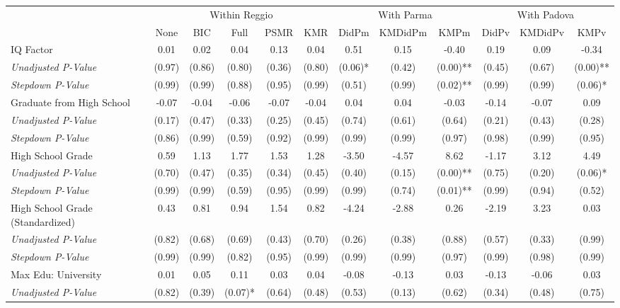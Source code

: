 \begin{tabular}{l c c c c c c c c c c c}
\toprule
& \multicolumn{5}{c}{Within Reggio} & \multicolumn{3}{c}{With Parma} & \multicolumn{3}{c}{With Padova} \\\cmidrule(lr){2-6} \cmidrule(lr){7-9} \cmidrule(lr){10-12}
 & None & BIC & Full & PSMR & KMR & DidPm & KMDidPm & KMPm & DidPv & KMDidPv & KMPv \\
\midrule
IQ Factor & 0.01 & 0.02 & 0.04 & 0.13 & 0.04 & 0.51 & 0.15 & -0.40 & 0.19 & 0.09 & -0.34 \\
\quad \textit{Unadjusted P-Value} & (0.97) & (0.86) & (0.80) & (0.36) & (0.80) & (0.06)* & (0.42) & (0.00)** & (0.45) & (0.67) & (0.00)** \\
\quad \textit{Stepdown P-Value} & (0.99) & (0.99) & (0.88) & (0.95) & (0.99) & (0.51) & (0.99) & (0.02)** & (0.99) & (0.99) & (0.06)* \\
Graduate from High School & -0.07 & -0.04 & -0.06 & -0.07 & -0.04 & 0.04 & 0.04 & -0.03 & -0.14 & -0.07 & 0.09 \\
\quad \textit{Unadjusted P-Value} & (0.17) & (0.47) & (0.33) & (0.25) & (0.45) & (0.74) & (0.61) & (0.64) & (0.21) & (0.43) & (0.28) \\
\quad \textit{Stepdown P-Value} & (0.86) & (0.99) & (0.59) & (0.92) & (0.99) & (0.99) & (0.99) & (0.97) & (0.98) & (0.99) & (0.95) \\
High School Grade & 0.59 & 1.13 & 1.77 & 1.53 & 1.28 & -3.50 & -4.57 & 8.62 & -1.17 & 3.12 & 4.49 \\
\quad \textit{Unadjusted P-Value} & (0.70) & (0.47) & (0.35) & (0.34) & (0.45) & (0.40) & (0.15) & (0.00)** & (0.75) & (0.20) & (0.06)* \\
\quad \textit{Stepdown P-Value} & (0.99) & (0.99) & (0.59) & (0.95) & (0.99) & (0.99) & (0.74) & (0.01)** & (0.99) & (0.94) & (0.52) \\
High School Grade (Standardized) & 0.43 & 0.81 & 0.94 & 1.54 & 0.82 & -4.24 & -2.88 & 0.26 & -2.19 & 3.23 & 0.03 \\
\quad \textit{Unadjusted P-Value} & (0.82) & (0.68) & (0.69) & (0.43) & (0.70) & (0.26) & (0.38) & (0.88) & (0.57) & (0.33) & (0.99) \\
\quad \textit{Stepdown P-Value} & (0.99) & (0.99) & (0.82) & (0.95) & (0.99) & (0.99) & (0.99) & (0.97) & (0.99) & (0.98) & (0.99) \\
Max Edu: University & 0.01 & 0.05 & 0.11 & 0.03 & 0.04 & -0.08 & -0.13 & 0.03 & -0.13 & -0.06 & 0.03 \\
\quad \textit{Unadjusted P-Value} & (0.82) & (0.39) & (0.07)* & (0.64) & (0.48) & (0.53) & (0.13) & (0.62) & (0.34) & (0.48) & (0.75) \\

\end{tabular}
